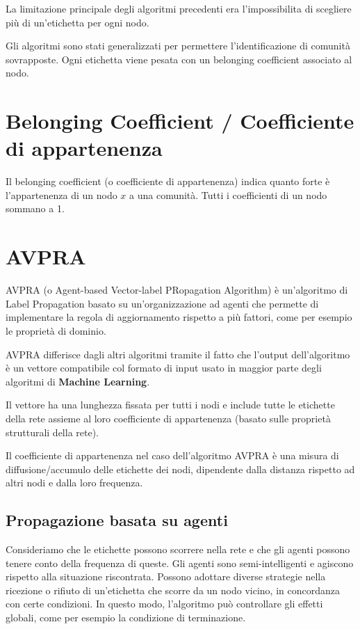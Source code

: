 \documentclass[a4paper,12pt]{report}
\begin{document}
	La limitazione principale degli algoritmi precedenti era l'impossibilita di scegliere più di un'etichetta per ogni nodo. 

	Gli algoritmi sono stati generalizzati per permettere l'identificazione di comunità sovrapposte. Ogni etichetta viene pesata con un belonging coefficient associato al nodo.  \cite{avpra}

	\section{Belonging Coefficient / Coefficiente di appartenenza}
	Il belonging coefficient (o coefficiente di appartenenza) indica quanto forte è l'appartenenza di un nodo $x$ a una comunità. Tutti i coefficienti di un nodo sommano a 1. \cite{gregory}

	\section{AVPRA}
	AVPRA (o Agent-based Vector-label PRopagation Algorithm) è un'algoritmo di Label Propagation basato su un'organizzazione ad agenti che permette di implementare la regola di aggiornamento rispetto a più fattori, come per esempio le proprietà di dominio. 

	AVPRA differisce dagli altri algoritmi tramite il fatto che l'output dell'algoritmo è un vettore compatibile col formato di input usato in maggior parte degli algoritmi di \textbf{Machine Learning}. 
	
	Il vettore ha una lunghezza fissata per tutti i nodi e include tutte le etichette della rete assieme al loro coefficiente di appartenenza (basato sulle proprietà strutturali della rete).

	Il coefficiente di appartenenza nel caso dell'algoritmo AVPRA è una misura di diffusione/accumulo delle etichette dei nodi, dipendente dalla distanza rispetto ad altri nodi e dalla loro frequenza. \cite{avpra} 

		\subsection{Propagazione basata su agenti}
		Consideriamo che le etichette possono scorrere nella rete e che gli agenti possono tenere conto della frequenza di queste. Gli agenti sono semi-intelligenti e agiscono rispetto alla situazione riscontrata. Possono adottare diverse strategie nella ricezione o rifiuto di un'etichetta che scorre da un nodo vicino, in concordanza con certe condizioni. In questo modo, l'algoritmo può controllare gli effetti globali, come per esempio la condizione di terminazione. \cite{avpra}
\end{document}
